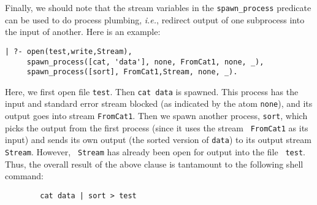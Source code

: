 Finally, we should note that the stream variables in the
\verb|spawn_process| predicate can be used to do process plumbing, {\it
  i.e.}, redirect output of one subprocess into the input of another. Here
is an example:
\begin{verbatim}
| ?- open(test,write,Stream),
     spawn_process([cat, 'data'], none, FromCat1, none, _),
     spawn_process([sort], FromCat1,Stream, none, _).  
\end{verbatim}
Here, we first open file {\tt test}. Then \verb|cat data| is spawned.
This process has the input and standard error stream blocked (as
indicated by the atom {\tt none}), and its output goes into stream
{\tt FromCat1}.  Then we spawn another process, {\tt sort}, which
picks the output from the first process (since it uses the stream {\tt
FromCat1} as its input) and sends its own output (the sorted version
of {\tt data}) to its output stream {\tt Stream}.  However, {\tt
Stream} has already been open for output into the file {\tt
test}. Thus, the overall result of the above clause is tantamount to
the following shell command:
\begin{verbatim}
        cat data | sort > test  
\end{verbatim}

